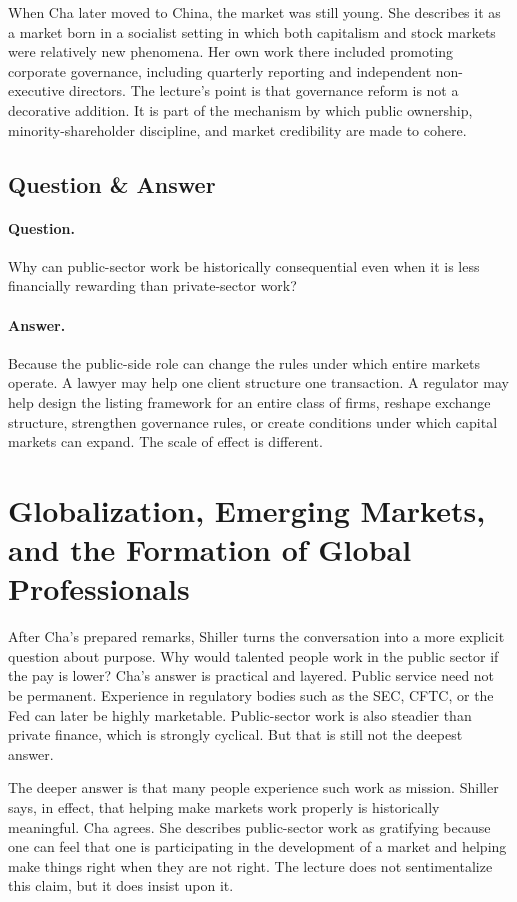 When Cha later moved to China, the market was still young. She describes it as a market born in a socialist setting in which both capitalism and stock markets were relatively new phenomena. Her own work there included promoting corporate governance, including quarterly reporting and independent non-executive directors. The lecture's point is that governance reform is not a decorative addition. It is part of the mechanism by which public ownership, minority-shareholder discipline, and market credibility are made to cohere.

\subsection{Question \& Answer}

\paragraph{Question.} Why can public-sector work be historically consequential even when it is less financially rewarding than private-sector work?

\paragraph{Answer.} Because the public-side role can change the rules under which entire markets operate. A lawyer may help one client structure one transaction. A regulator may help design the listing framework for an entire class of firms, reshape exchange structure, strengthen governance rules, or create conditions under which capital markets can expand. The scale of effect is different.

\section{Globalization, Emerging Markets, and the Formation of Global Professionals}

After Cha's prepared remarks, Shiller turns the conversation into a more explicit question about purpose. Why would talented people work in the public sector if the pay is lower? Cha's answer is practical and layered. Public service need not be permanent. Experience in regulatory bodies such as the SEC, CFTC, or the Fed can later be highly marketable. Public-sector work is also steadier than private finance, which is strongly cyclical. But that is still not the deepest answer.

The deeper answer is that many people experience such work as mission. Shiller says, in effect, that helping make markets work properly is historically meaningful. Cha agrees. She describes public-sector work as gratifying because one can feel that one is participating in the development of a market and helping make things right when they are not right. The lecture does not sentimentalize this claim, but it does insist upon it.

